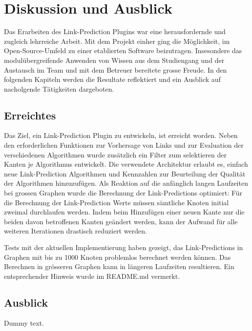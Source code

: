 \chapter{Diskussion und Ausblick}

Das Erarbeiten des Link-Prediction Plugins war eine herausfordernde und zugleich lehrreiche Arbeit.
Mit dem Projekt einher ging die Möglichkeit, im Open-Source-Umfeld zu einer etablierten Software beizutragen.
Insesondere das modulübergreifende Anwenden von Wissen aus dem Studiengang und der Austausch im Team und mit dem Betreuer bereitete grosse Freude.
In den folgenden Kapiteln werden die Resultate reflektiert und ein Ausblick auf nacholgende Tätigkeiten dargeboten.

\section{Erreichtes}

Das Ziel, ein Link-Prediction Plugin zu entwickeln, ist erreicht worden.
Neben den erforderlichen Funktionen zur Vorhersage von Links und zur Evaluation der verschiedenen Algorithmen wurde zusätzlich ein Filter zum selektieren der Kanten je Algorithmus entwickelt.
Die verwendete Architektur erlaubt es, einfach neue Link-Prediction Algorithmen und Kennzahlen zur Beurteilung der Qualität der Algorithmen hinzuzufügen.
Als Reaktion auf die anfänglich langen Laufzeiten bei grossen Graphen wurde die Berechnung der Link-Predictions optimiert:
Für die Berechnung der Link-Prediction Werte müssen sämtliche Knoten initial zweimal durchlaufen werden.
Indem beim Hinzufügen einer neuen Kante nur die beiden davon betroffenen Kanten geändert werden, kann der Aufwand für alle weiteren Iterationen drastisch reduziert werden.

Tests mit der aktuellen Implementierung haben gezeigt, das Link-Predictions in Graphen mit bis zu 1000 Knoten problemlos berechnet werden können.
Das Berechnen in grösseren Graphen kann in längeren Laufzeiten resultieren.
Ein entsprechender Hinweis wurde im README.md vermerkt.


\section{Ausblick}

Dummy text.
